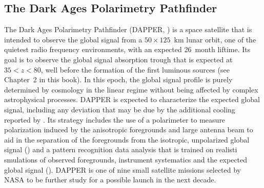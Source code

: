 \subsection{The Dark Ages Polarimetry Pathfinder}
The Dark Ages Polarimetry Pathfinder (DAPPER, \cite{burns19}) is a space satellite that is intended to observe the global signal from a $50 \times 125$~km lunar orbit, one of the quietest radio frequency environments, with an expected 26~month liftime. Its goal is to observe the global signal absorption trough that is expected at $35 < z < 80$, well before the formation of the first luminous sources (see Chapter~2 in this book). In this epoch, the global signal profile is purely determined by cosmology in the linear regime without being affected by complex astrophysical processes. DAPPER is expected to characterize the expected global signal, including any deviation that may be due by the additional cooling reported by \cite{bowman18}. Its strategy includes the use of a polarimeter to measure polarization induced by the anisotropic foregrounds and large antenna beam to aid in the separation of the foregrounds from the isotropic, unpolarized global signal (\cite{nhan17}) and a pattern recognition data analysis that is trained on realisti smulations of observed foregrounds, instrument systematics and the expected global signal (\cite{tauscher18}).
%
DAPPER is one of nine small satellite missions selected by NASA to be further study for a possible launch in the next decade.

